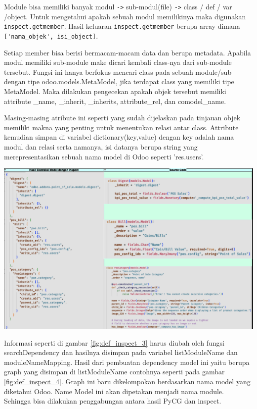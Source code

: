 Module bisa memiliki banyak modul \verb|->| sub-modul(file) \verb|->| class / def / var /object. Untuk mengetahui apakah sebuah modul memilikinya maka digunakan \verb|inspect.getmember|. Hasil keluaran \verb|inspect.getmember| berupa array dimana \verb|['nama_objek', isi_object]|. 

Setiap member bisa berisi bermacam-macam data dan berupa metadata. Apabila modul memiliki sub-module make dicari kembali class-nya dari sub-module tersebut. Fungsi ini hanya berfokus mencari class pada sebuah module/sub dengan tipe odoo.models.MetaModel, jika terdapat class yang memiliki tipe MetaModel. Maka dilakukan pengecekan apakah objek tersebut memiliki attribute {\_}name, {\_}inherit, {\_}inherits, attribute{\_}rel, dan comodel{\_}name. 

Masing-masing atribute ini seperti yang sudah dijelaskan pada tinjauan objek memiliki makna yang penting untuk menentukan relasi antar class. Attribute kemudian simpan di variabel dictionary(key,value) dengan key adalah nama modul dan relasi serta namanya, isi datanya berupa string yang merepresentasikan sebuah nama model di Odoo seperti 'res.users'. 

\begin{center}
	\includegraphics[width=14cm]{img/bab_4/def_inspect_3.png}
	\label{fig:def_inspect_3}
\end{center}

Informasi seperti di gambar \ref{fig:def_inspect_3} harus diubah oleh fungsi searchDependency dan hasilnya disimpan pada variabel listModuleName dan moduleNameMapping.
Hasil dari pembuatan dependency model ini yaitu berupa graph yang disimpan di listModuleName contohnya seperti pada gambar \ref{fig:def_inspect_4}. Graph ini baru dikelompokan berdasarkan nama model yang diketahui Odoo. Name Model ini akan dipetakan menjadi nama module. Sehingga bisa dilakukan penggabungan antara hasil PyCG dan inspect.

